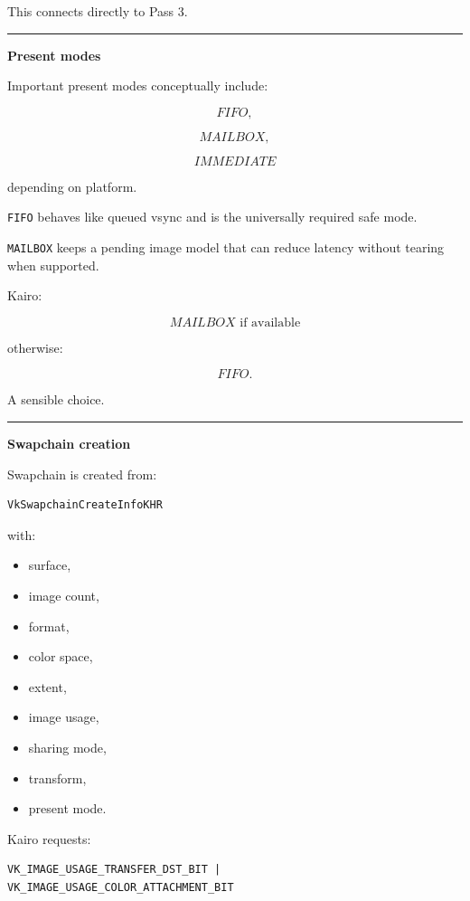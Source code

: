 This connects directly to Pass 3.

\begin{center}\rule{0.5\linewidth}{0.5pt}\end{center}

\textbf{Present modes}

Important present modes conceptually include:

\[
FIFO,
\]

\[
MAILBOX,
\]

\[
IMMEDIATE
\]

depending on platform.

\texttt{FIFO} behaves like queued vsync and is the universally required safe mode.

\texttt{MAILBOX} keeps a pending image model that can reduce latency without tearing when supported.

Kairo:

\[
\boxed{
MAILBOX\text{ if available}
}
\]

otherwise:

\[
\boxed{
FIFO.
}
\]

A sensible choice.

\begin{center}\rule{0.5\linewidth}{0.5pt}\end{center}

\textbf{Swapchain creation}

Swapchain is created from:

\begin{verbatim}
VkSwapchainCreateInfoKHR
\end{verbatim}

with:

\begin{itemize}
\tightlist
\item
  surface,
\item
  image count,
\item
  format,
\item
  color space,
\item
  extent,
\item
  image usage,
\item
  sharing mode,
\item
  transform,
\item
  present mode.
\end{itemize}

Kairo requests:

\begin{verbatim}
VK_IMAGE_USAGE_TRANSFER_DST_BIT |
VK_IMAGE_USAGE_COLOR_ATTACHMENT_BIT
\end{verbatim}

